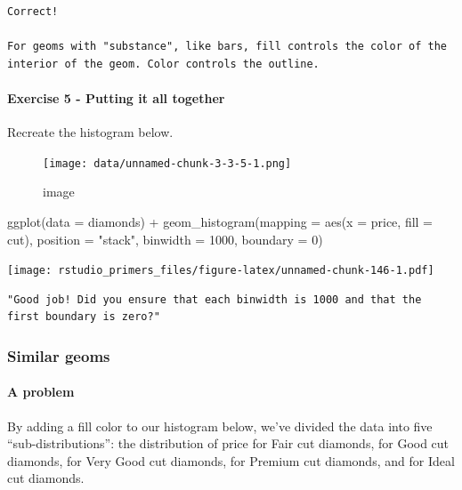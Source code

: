 \documentclass[
]{article}
\newenvironment{Shaded}{\begin{snugshade}}{\end{snugshade}}
\newcommand{\AttributeTok}[1]{\textcolor[rgb]{0.77,0.63,0.00}{#1}}
\newcommand{\DecValTok}[1]{\textcolor[rgb]{0.00,0.00,0.81}{#1}}
\newcommand{\FunctionTok}[1]{\textcolor[rgb]{0.00,0.00,0.00}{#1}}
\newcommand{\NormalTok}[1]{#1}
\newcommand{\SpecialCharTok}[1]{\textcolor[rgb]{0.00,0.00,0.00}{#1}}
\newcommand{\StringTok}[1]{\textcolor[rgb]{0.31,0.60,0.02}{#1}}
\begin{document}
\begin{verbatim}
Correct!

For geoms with "substance", like bars, fill controls the color of the interior of the geom. Color controls the outline.
\end{verbatim}

\hypertarget{exercise-5---putting-it-all-together}{%
\paragraph{Exercise 5 - Putting it all
together}\label{exercise-5---putting-it-all-together}}

Recreate the histogram below.

\begin{figure}
\centering
\texttt{[image: data/unnamed-chunk-3-3-5-1.png]}
\caption{image}
\end{figure}

\begin{Shaded}
\begin{Highlighting}[]
\FunctionTok{ggplot}\NormalTok{(}\AttributeTok{data =}\NormalTok{ diamonds) }\SpecialCharTok{+}
  \FunctionTok{geom\_histogram}\NormalTok{(}\AttributeTok{mapping =} \FunctionTok{aes}\NormalTok{(}\AttributeTok{x =}\NormalTok{ price, }\AttributeTok{fill =}\NormalTok{ cut), }\AttributeTok{position =} \StringTok{"stack"}\NormalTok{, }\AttributeTok{binwidth =} \DecValTok{1000}\NormalTok{, }\AttributeTok{boundary =} \DecValTok{0}\NormalTok{)}
\end{Highlighting}
\end{Shaded}

\texttt{[image: rstudio\_primers\_files/figure-latex/unnamed-chunk-146-1.pdf]}

\begin{verbatim}
"Good job! Did you ensure that each binwidth is 1000 and that the first boundary is zero?"
\end{verbatim}

\hypertarget{similar-geoms}{%
\subsubsection{Similar geoms}\label{similar-geoms}}

\hypertarget{a-problem}{%
\paragraph{A problem}\label{a-problem}}

By adding a fill color to our histogram below, we've divided the data
into five ``sub-distributions'': the distribution of price for Fair cut
diamonds, for Good cut diamonds, for Very Good cut diamonds, for Premium
cut diamonds, and for Ideal cut diamonds.
\end{document}
